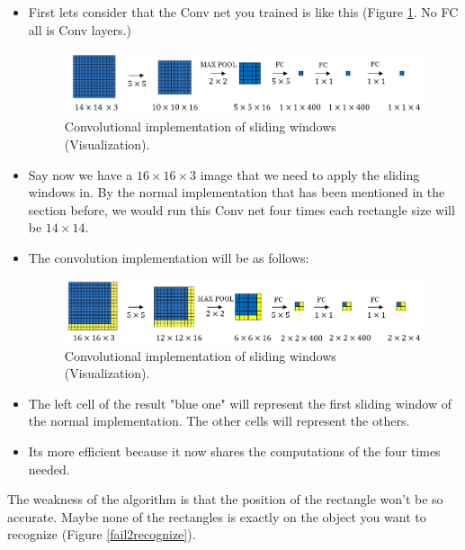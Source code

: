 \begin{itemize}
    \item First lets consider that the Conv net you trained is like this (Figure \ref{sliding-window2}. No FC all is Conv layers.)
    \begin{figure}[!htbp]
        \centering
        \includegraphics[width=1.0\textwidth]{img/c4/sliding-window2.png}
        \caption{Convolutional implementation of sliding windows (Visualization).}
        \label{sliding-window2}
    \end{figure}
    \item Say now we have a $16\times 16\times 3$ image that we need to apply the sliding windows in. By the normal implementation that has been mentioned in the section before, we would run this Conv net four times each rectangle size will be $14\times 14$.
    \item The convolution implementation will be as follows:
        \begin{figure}[!htbp]
            \centering
            \includegraphics[width=1.0\textwidth]{img/c4/sliding-window3.png}
            \caption{Convolutional implementation of sliding windows (Visualization).}
            \label{sliding-window3}
        \end{figure}
    \item The left cell of the result "blue one" will represent the first sliding window of the normal implementation. The other cells will represent the others.
    \item Its more efficient because it now shares the computations of the four times needed.
\end{itemize}

The weakness of the algorithm is that the position of the rectangle won't be so accurate. Maybe none of the rectangles is exactly on the object you want to recognize (Figure \ref{fail2recognize}).

